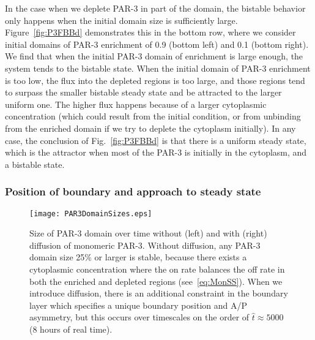\documentclass[11pt]{article}
\newcommand{\6}[1]{#1_{\text{6}}}
\newcommand{\3}[1]{#1_{\text{3}}}
\begin{document}
In the case when we deplete PAR-3 in part of the domain, the bistable behavior only happens when the initial domain size is sufficiently large. Figure\ \ref{fig:P3FBBd} demonstrates this in the bottom row, where we consider initial domains of PAR-3 enrichment of 0.9 (bottom left) and 0.1 (bottom right). We find that when the initial PAR-3 domain of enrichment is large enough, the system tends to the bistable state. When the initial domain of PAR-3 enrichment is too low, the flux into the depleted regions is too large, and those regions tend to surpass the smaller bistable steady state and be attracted to the larger uniform one. The higher flux happens because of a larger cytoplasmic concentration (which could result from the initial condition, or from unbinding from the enriched domain if we try to deplete the cytoplasm initially). In any case, the conclusion of Fig.\ \ref{fig:P3FBBd} is that there is a uniform steady state, which is the attractor when most of the PAR-3 is initially in the cytoplasm, and a bistable state.

\subsubsection{Position of boundary and approach to steady state}

\begin{figure}
\centering
\texttt{[image: PAR3DomainSizes.eps]}
\caption{\label{fig:WWoDiff}Size of PAR-3 domain over time without (left) and with (right) diffusion of monomeric PAR-3. Without diffusion, any PAR-3 domain size 25\% or larger is stable, because there exists a cytoplasmic concentration where the on rate balances the off rate in both the enriched and depleted regions (see\ \eqref{eq:MonSS}). When we introduce diffusion, there is an additional constraint in the boundary layer which specifies a unique boundary position and A/P asymmetry, but this occurs over timescales on the order of $\hat t \approx 5000$ (8 hours of real time).}
\end{figure}
\end{document}
